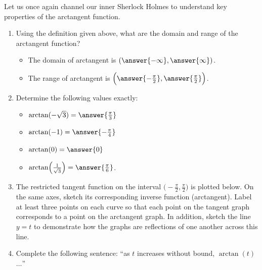 \documentclass{ximera}
\begin{document}
\begin{problem}
Let us once again channel our inner Sherlock Holmes to understand key properties of the arctangent function.%
\par
\begin{enumerate}
\item Using the definition given above, what are the domain and range of the arctangent function?
%
\begin{itemize}
\item The domain of arctangent is $(\answer{-\infty} , \answer{\infty})$.
%
\item The range of arctangent is $\Big(\answer{-\frac{\pi}{2}} , \answer{\frac{\pi}{2}} \Big)$.
\end{itemize}
%
\item Determine the following values exactly: 
\begin{itemize}
\item $\arctan(-\sqrt{3}) = \answer{\frac{\pi}{3}}$
%
\item $\arctan(-1) = \answer{-\frac{\pi}{4}}$
%
\item $\arctan(0) = \answer{0}$
%
\item $\arctan\!\Big(\frac{1}{\sqrt{3}}\Big) = \answer{\frac{\pi}{6}}$.
\end{itemize}
%
\item The restricted tangent function on the interval $\Big(\!-\frac{\pi}{2}, \frac{\pi}{2}\Big)$ is plotted below. On the same axes, sketch its corresponding inverse function (arctangent).  Label at least three points on each curve so that each point on the tangent graph corresponds to a point on the arctangent graph. In addition, sketch the line $y = t$ to demonstrate how the graphs are reflections of one another across this line.%
%
\item Complete the following sentence:  ``as $t$ increases without bound, $\arctan(t)$ $\ldots$'' %
\end{enumerate}

\end{problem}
\end{document}
